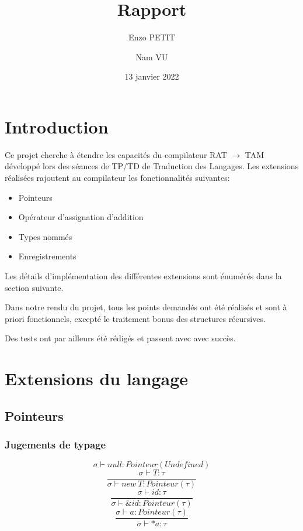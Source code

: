 \documentclass[headings=standardclasses,parskip=half]{scrartcl}
\title{Rapport}
\subtitle{}
\author{Enzo PETIT \and Nam VU}
\date{13 janvier 2022}
\begin{document}
\maketitle

\pagebreak

\tableofcontents

\pagebreak

\section{Introduction}

Ce projet cherche à étendre les capacités du compilateur RAT \(\to\)
TAM développé lors des séances de TP/TD de Traduction des Langages.
Les extensions réalisées rajoutent au compilateur
les fonctionnalités suivantes:

\begin{itemize}
    \item Pointeurs
    \item Opérateur d'assignation d'addition
    \item Types nommés
    \item Enregistrements
\end{itemize}

Les détails d'implémentation des différentes extensions sont énumérés
dans la section suivante.

Dans notre rendu du projet, tous les points demandés ont été réalisés
et sont à priori fonctionnels, excepté le traitement bonus des structures
récursives.

Des tests ont par ailleurs été rédigés et passent avec avec succès.

\section{Extensions du langage}

\subsection{Pointeurs}

\subsubsection*{Jugements de typage}

\[\sigma \vdash null : Pointeur(Undefined)\]
\[\frac{\sigma \vdash T : \tau}{\sigma \vdash new\ T : Pointeur(\tau)}\]
\[\frac{\sigma \vdash id : \tau}{\sigma \vdash \&id : Pointeur(\tau)}\]
\[\frac{\sigma \vdash a : Pointeur(\tau)}{\sigma \vdash *a : \tau}\]
\end{document}
